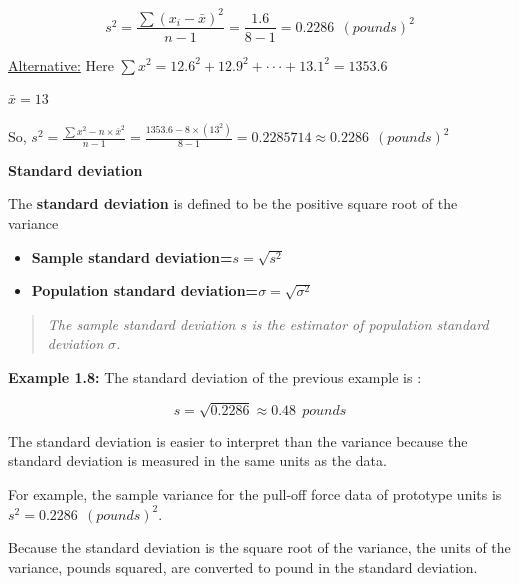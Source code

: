 \documentclass[
  11pt,
  letterpaper,
  DIV=11,
  numbers=noendperiod]{scrreprt}
\begin{document}
\[s^2=\frac{\sum (x_i-\bar x)^2}{n-1}=\frac{1.6}{8-1}=0.2286 \ \ (pounds)^2 \]

\ul{Alternative:} Here
\(\sum x^2 =12.6^2+12.9^2+\cdot \cdot\cdot+13.1^2=1353.6\)

\(\bar x=13\)

So,
\(s^2=\frac{\sum x^2-n\times \bar x^2}{n-1}=\frac{1353.6-8\times (13^2)}{8-1}=0.2285714\approx 0.2286 \ \ (pounds)^2\)

\textbf{Standard deviation}

The \textbf{standard deviation} is defined to be the positive square
root of the variance

\begin{itemize}
\item
  \textbf{Sample standard deviation=}\(s=\sqrt {s^2}\)
\item
  \textbf{Population standard deviation=}\(\sigma =\sqrt {\sigma ^2}\)
\end{itemize}

\begin{quote}
\emph{The sample standard deviation} \(s\) \emph{is the estimator of
population standard deviation} \(\sigma\)\emph{.}
\end{quote}

\textbf{Example 1.8:} The standard deviation of the previous example is
:

\[ s=\sqrt {0.2286} \approx0.48 \ \ pounds\]

\begin{tcolorbox}[enhanced jigsaw, bottomrule=.15mm, toprule=.15mm, title=\textcolor{quarto-callout-note-color}{\faInfo}\hspace{0.5em}{Note:}, bottomtitle=1mm, colframe=quarto-callout-note-color-frame, coltitle=black, rightrule=.15mm, toptitle=1mm, colbacktitle=quarto-callout-note-color!10!white, titlerule=0mm, breakable, arc=.35mm, leftrule=.75mm, opacitybacktitle=0.6, opacityback=0, colback=white, left=2mm]

The standard deviation is easier to interpret than the variance because
the standard deviation is measured in the same units as the data.

\end{tcolorbox}

For example, the sample variance for the pull-off force data of
prototype units is \(s^2=0.2286 \ \ (pounds)^2\).

Because the standard deviation is the square root of the variance, the
units of the variance, pounds squared, are converted to pound in the
standard deviation.
\end{document}
